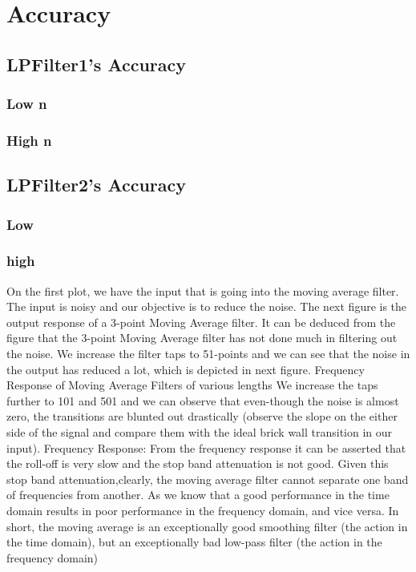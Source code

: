 \section{Accuracy}

\subsection{LPFilter1's Accuracy}

\subsubsection{Low n}

\subsubsection{High n}

\subsection{LPFilter2's Accuracy}

\subsubsection{Low}

\subsubsection{high}

On the first plot, we have the input that is going into the moving average filter. The input is noisy
and our objective is to reduce the noise. The next figure is the output response of a 3-point
Moving Average filter. It can be deduced from the figure that the 3-point Moving Average filter
has not done much in filtering out the noise. We increase the filter taps to 51-points and we can
see that the noise in the output has reduced a lot, which is depicted in next figure.
Frequency Response of Moving Average Filters of various lengths
We increase the taps further to 101 and 501 and we can observe that even-though the noise is
almost zero, the transitions are blunted out drastically (observe the slope on the either side of the
signal and compare them with the ideal brick wall transition in our input).
Frequency Response:
From the frequency response it can be asserted that the roll-off is very slow and the stop band
attenuation is not good. Given this stop band attenuation,clearly, the moving average filter
cannot separate one band of frequencies from another. As we know that a good performance in
the time domain results in poor performance in the frequency domain, and vice versa. 
In short, the moving average is an exceptionally good smoothing filter (the action in the time
domain), but an exceptionally bad low-pass filter (the action in the frequency domain)